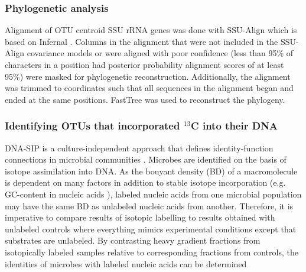 \documentclass{article}
\begin{document}
\subsubsection{Phylogenetic analysis}
Alignment of OTU centroid SSU rRNA genes was done with SSU-Align which is based on Infernal
\citep{Nawrocki_2013,Nawrocki_2009}. Columns in the alignment that were not included in
the SSU-Align covariance models or were aligned with poor confidence (less than
95\% of characters in a position had posterior probability alignment scores of
at least 95\%) were masked for phylogenetic reconstruction. Additionally, the
alignment was trimmed to coordinates such that all sequences in the alignment
began and ended at the same positions. FastTree \citep{Price_2009} was used to
reconstruct the phylogeny.

\subsubsection{Identifying OTUs that incorporated $^{13}$C into their DNA}\label{fc}
DNA-SIP is a culture-independent approach that defines identity-function
connections in microbial communities
\citep{Buckley_2011,Neufeld_2007,Radajewski_2003}. Microbes are identified on
the basis of isotope assimilation into DNA. As the bouyant density (BD) of
a macromolecule is dependent on many factors in addition to stable isotope
incorporation (e.g. GC-content in nucleic acids \citep{Youngblut_2014}),
labeled nucleic acids from one microbial population may have the same BD as
unlabeled nucleic acids from another. Therefore, it is imperative to compare
results of isotopic labelling to results obtained with unlabeled controls where
everything mimics experimental conditions except that substrates are unlabeled.
By contrasting heavy gradient fractions from isotopically labeled samples
relative to corresponding fractions from controls, the identities of microbes
with labeled nucleic acids can be determined 
\end{document}
